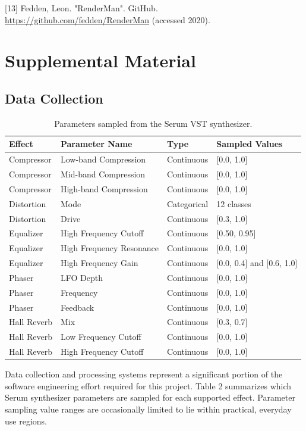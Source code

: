 \documentclass{article}
\begin{document}
[13] Fedden, Leon. "RenderMan". GitHub. \url{https://github.com/fedden/RenderMan} (accessed 2020).

\pagebreak
\normalsize

\section{Supplemental Material}

\subsection{Data Collection}

\begin{table}[h]
  \caption{Parameters sampled from the Serum VST synthesizer.}
  \centering
  \begin{tabular}{llll}
    \toprule
    Effect & Parameter Name & Type & Sampled Values \\
    \midrule
    Compressor & Low-band Compression & Continuous & [0.0, 1.0] \\
    Compressor & Mid-band Compression & Continuous & [0.0, 1.0] \\
    Compressor & High-band Compression & Continuous & [0.0, 1.0] \\
    Distortion & Mode & Categorical & 12 classes \\
    Distortion & Drive & Continuous & [0.3, 1.0] \\
    Equalizer & High Frequency Cutoff & Continuous & [0.50, 0.95] \\
    Equalizer & High Frequency Resonance & Continuous & [0.0, 1.0] \\
    Equalizer & High Frequency Gain & Continuous & [0.0, 0.4] and [0.6, 1.0] \\
    Phaser & LFO Depth & Continuous & [0.0, 1.0] \\
    Phaser & Frequency & Continuous & [0.0, 1.0] \\
    Phaser & Feedback & Continuous & [0.0, 1.0] \\
    Hall Reverb & Mix & Continuous &  [0.3, 0.7] \\
    Hall Reverb & Low Frequency Cutoff & Continuous &  [0.0, 1.0] \\
    Hall Reverb & High Frequency Cutoff & Continuous &  [0.0, 1.0] \\
    \bottomrule
  \end{tabular}
\end{table}


Data collection and processing systems represent a significant portion of the software engineering effort required for this project. Table 2 summarizes which Serum synthesizer parameters are sampled for each supported effect. Parameter sampling value ranges are occasionally limited to lie within practical, everyday use regions.
\end{document}
